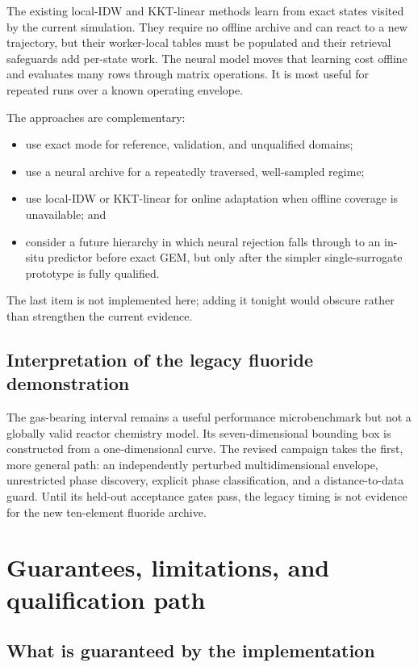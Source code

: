 \documentclass[11pt]{article}
\begin{document}
The existing local-IDW and KKT-linear methods learn from exact states visited by the current
simulation.  They require no offline archive and can react to a new trajectory, but their
worker-local tables must be populated and their retrieval safeguards add per-state work.  The
neural model moves that learning cost offline and evaluates many rows through matrix operations.
It is most useful for repeated runs over a known operating envelope.

The approaches are complementary:
\begin{itemize}[leftmargin=*]
  \item use exact mode for reference, validation, and unqualified domains;
  \item use a neural archive for a repeatedly traversed, well-sampled regime;
  \item use local-IDW or KKT-linear for online adaptation when offline coverage is unavailable; and
  \item consider a future hierarchy in which neural rejection falls through to an in-situ
  predictor before exact GEM, but only after the simpler single-surrogate prototype is fully
  qualified.
\end{itemize}
The last item is not implemented here; adding it tonight would obscure rather than strengthen the
current evidence.

\subsection{Interpretation of the legacy fluoride demonstration}

The gas-bearing interval remains a useful performance microbenchmark but not a globally valid
reactor chemistry model.  Its seven-dimensional bounding box is constructed from a one-dimensional
curve.  The revised campaign takes the first, more general path: an independently perturbed
multidimensional envelope, unrestricted phase discovery, explicit phase classification, and a
distance-to-data guard.  Until its held-out acceptance gates pass, the legacy timing is not
evidence for the new ten-element fluoride archive.

\section{Guarantees, limitations, and qualification path}

\subsection{What is guaranteed by the implementation}
\end{document}

